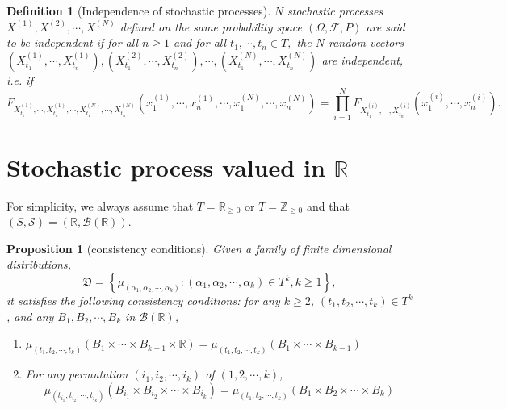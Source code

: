 \documentclass{report}
\newtheorem{definition}{Definition}[section]
\newtheorem{proposition}{Proposition}[section]
\theoremstyle{nonumberplain}
\begin{document}
\begin{definition}[Independence of stochastic processes]
	$N$ stochastic processes $X^{(1)},X^{(2)},\cdots,X^{(N)}$ defined on the same probability space $(\Omega, \mathcal{F}, P)$ are said to be independent if for all $n\ge1$ and for all $t_{1}, \cdots, t_{n} \in T,$ the $N$ random vectors $\left(X^{(1)}_{t_{1}}, \cdots, X^{(1)}_{t_{n}}\right), \left(X^{(2)}_{t_{1}}, \cdots, X^{(2)}_{t_{n}}\right),\cdots,\left(X^{(N)}_{t_{1}}, \cdots, X^{(N)}_{t_{n}}\right)$ are independent, i.e. if
	\[
	F_{X^{(1)}_{t_{1}}, \cdots, X^{(1)}_{t_{n}}, \cdots, X^{(N)}_{t_{1}}, \cdots, X^{(N)}_{t_{n}}}\left(x^{(1)}_{1}, \cdots, x^{(1)}_{n}, \cdots, x^{(N)}_{1}, \cdots, x^{(N)}_{n}\right)=\prod_{i=1}^N F_{X^{(i)}_{t_1}, \cdots, X^{(i)}_{t_{n}}}\left(x^{(i)}_{1}, \cdots, x^{(i)}_{n}\right) .
	\]
\end{definition}


\section{Stochastic process valued in $\mathbb{R}$}

For simplicity, we always assume that $T=\mathbb{R}_{\ge 0}$ or $T=\mathbb{Z}_{\ge 0}$ and that $(S,\mathcal{S})=(\mathbb{R},\mathcal{B}(\mathbb{R}))$.

\begin{proposition}[consistency conditions]
	Given a family of finite dimensional distributions,
	$$
	\mathfrak{D}=\left\{\mu_{\left(\alpha_{1}, \alpha_{2}, \cdots, \alpha_{k}\right)}:\left(\alpha_{1}, \alpha_{2}, \cdots, \alpha_{k}\right) \in T^{k}, k\ge1 \right\},
	$$
	it satisfies the following consistency conditions: for any $k\ge2$, $\left(t_{1}, t_{2}, \cdots, t_{k}\right) \in T^k$, and any $B_{1}, B_{2}, \cdots, B_{k}$ in $\mathcal{B}(\mathbb{R})$,
	\begin{enumerate}
		\item[(C1)] $\mu_{\left(t_{1}, t_{2}, \cdots, t_{k}\right)}\left(B_{1} \times \cdots \times B_{k-1} \times \mathbb{R}\right)=\mu_{\left(t_{1}, t_{2}, \cdots, t_{k}\right)}\left(B_{1} \times \cdots \times B_{k-1}\right)$
		\item[(C2)] For any permutation $\left(i_{1}, i_{2}, \cdots, i_{k}\right)$ of $(1,2, \cdots, k)$,
		\[
		\mu_{\left(t_{i_{1}}, t_{i_{2}}, \cdots, t_{i_{k}}\right)}\left(B_{i_{1}} \times B_{i_{2}} \times \cdots \times B_{i_{k}}\right)=\mu_{\left(t_{1}, t_{2}, \cdots, t_{k}\right)}\left(B_{1} \times B_{2} \times \cdots \times B_{k}\right)
		\]
	\end{enumerate}
\end{proposition}
\end{document}
